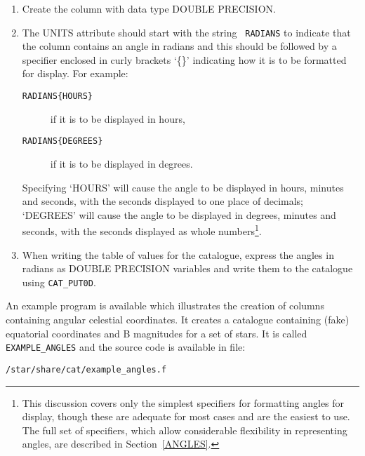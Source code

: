 \begin{enumerate}

  \item Create the column with data type DOUBLE PRECISION.

  \item The UNITS attribute should start with the string {\tt
   RADIANS} to indicate that the column contains an angle in
   radians and this should be followed by a specifier enclosed in
   curly brackets `\{\}' indicating how it is to be formatted for
   display. For example:

  \begin{description}

    \item[{\tt RADIANS\{HOURS\} }] if it is to be displayed in
     hours,

    \item[{\tt RADIANS\{DEGREES\} }] if it is to be displayed in
     degrees.

  \end{description}

   Specifying `HOURS' will cause the angle to be displayed in
   hours, minutes and seconds, with the seconds displayed to one
   place of decimals; `DEGREES' will cause the angle to be
   displayed in degrees, minutes and seconds, with the seconds
   displayed as whole numbers\footnote{This discussion covers only
   the simplest specifiers for formatting angles for display,
   though these are adequate for most cases and are the easiest to
   use. The full set of specifiers, which allow considerable
   flexibility in representing angles, are described in
   Section~\ref{ANGLES}.}.

  \item When writing the table of values for the catalogue,
   express the angles in radians as DOUBLE PRECISION variables and
   write them to the catalogue using {\tt CAT\_PUT0D}.

\end{enumerate}

An example program is available which illustrates the creation
of columns containing angular celestial coordinates. It creates
a catalogue containing (fake) equatorial coordinates and B
magnitudes for a set of stars. It is called {\tt EXAMPLE\_ANGLES} and
the source code is available in file:

\begin{center}
{\tt /star/share/cat/example\_angles.f}
\end{center}


